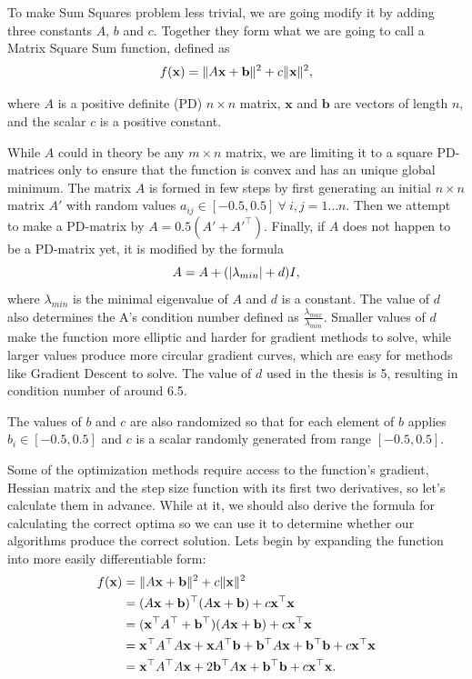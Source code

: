 \documentclass[a4paper,english,titlepage,12pt]{article}
\newcommand{\vect}[1]{\ensuremath{\mathbf{#1}}}
\newcommand{\trans}[1]{\ensuremath\vect{#1}^\top}
\newcommand{\norm}[1]{\ensuremath\Vert #1 \Vert}
\newcommand{\abs}[1]{\ensuremath|#1|}
\begin{document}
To make Sum Squares problem less trivial, we are going modify it by adding three constants $A$, $b$ and $c$. Together they form what we are going to call a Matrix Square Sum function, defined as
\begin{equation}
    f(\vect{x}) = \norm{A \vect{x} + \vect{b}} ^ 2 + c \norm{\vect{x}} ^ 2,
\end{equation}

where $A$ is a positive definite (PD) $n \times n$ matrix, $\vect{x}$ and $\vect{b}$ are vectors of length $n$, and the scalar $c$ is a positive constant.

While $A$ could in theory be any $m \times n$ matrix, we are limiting it to a square PD-matrices only to ensure that the function is convex and has an unique global minimum. The matrix $A$ is formed in few steps by first generating an initial $n \times n$ matrix $A'$ with random values $a_{ij} \in [-0.5, 0.5]\ \forall\ i,j = 1 \dots n$. Then we attempt to make a PD-matrix by $A = 0.5 (A' + A'^\top)$. Finally, if  $A$ does not happen to be a PD-matrix yet, it is modified by the formula 
\begin{equation}
    A = A + (\abs{\lambda_{min}} + d) I,
\end{equation}
where $\lambda_{min}$ is the minimal eigenvalue of $A$ and $d$ is a constant. The value of $d$ also determines the A's condition number defined as $\frac{\lambda_{max}}{\lambda_{min}}$. Smaller values of $d$ make the function more elliptic and harder for gradient methods to solve, while larger values produce more circular gradient curves, which are easy for methods like Gradient Descent to solve. The value of $d$ used in the thesis is 5, resulting in condition number of around 6.5.

The values of $b$ and $c$ are also randomized so that for each element of $b$ applies $b_i \in [-0.5, 0.5]$ and $c$ is a scalar randomly generated from range $[-0.5, 0.5]$.

Some of the optimization methods require access to the function's gradient, Hessian matrix and the step size function with its first two derivatives, so let's calculate them in advance. While at it, we should also derive the formula for calculating the correct optima so we can use it to determine whether our algorithms produce the correct solution. Lets begin by expanding the function into more easily differentiable form:
\begin{align*}
    f(\vect{x}) &= \norm{A \vect{x} + \vect{b}} ^ 2 + c \norm{\vect{x}} ^ 2 \\
               &= (A \vect{x} + \vect{b})^\top(A \vect{x} + \vect{b}) + c \trans{x} \vect{x} \\
               &= (\trans{x} A^\top + \trans{b})(A\vect{x} + \vect{b}) + c \trans{x} \vect{x} \\
               &= \trans{x} A^\top A \vect{x} + \vect{x} A^\top \vect{b} + \trans{b} A \vect{x} + \trans{b} \vect{b} + c \trans{x} \vect{x} \\
               &= \trans{x} A^\top A \vect{x} + 2 \trans{b} A \vect{x} + \trans{b} \vect{b} + c \trans{x} \vect{x}.
\end{align*}
\end{document}
